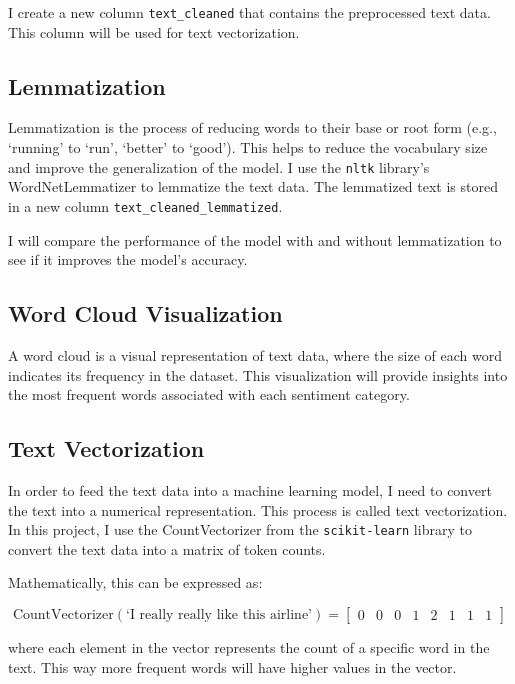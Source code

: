 \documentclass{article}
\begin{document}
I create a new column \texttt{text\_cleaned} that contains the preprocessed text data. This column will be used for text vectorization.

\subsection{Lemmatization}

Lemmatization is the process of reducing words to their base or root form (e.g., `running' to `run', `better' to `good'). This helps to reduce the vocabulary size and improve the generalization of the model. I use the \texttt{nltk} library's WordNetLemmatizer to lemmatize the text data. The lemmatized text is stored in a new column \texttt{text\_cleaned\_lemmatized}.

I will compare the performance of the model with and without lemmatization to see if it improves the model's accuracy.

\subsection{Word Cloud Visualization}

A word cloud is a visual representation of text data, where the size of each word indicates its frequency in the dataset. This visualization will provide insights into the most frequent words associated with each sentiment category.

\subsection{Text Vectorization}

In order to feed the text data into a machine learning model, I need to convert the text into a numerical representation. This process is called text vectorization. In this project, I use the CountVectorizer from the \texttt{scikit-learn} library to convert the text data into a matrix of token counts.

Mathematically, this can be expressed as:

\[
\text{CountVectorizer}(\text{`I really really like this airline'}) = \begin{bmatrix}
0 & 0 & 0 & 1 & 2 & 1 & 1 & 1
\end{bmatrix}
\]

where each element in the vector represents the count of a specific word in the text. This way more frequent words will have higher values in the vector.
\end{document}

